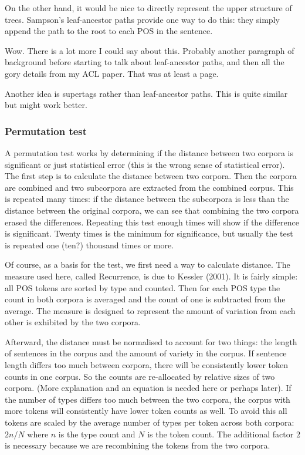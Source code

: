 \documentclass[11pt]{article}
\begin{document}
On the other hand, it would be nice to directly represent the upper
structure of trees. Sampson's leaf-ancestor paths provide one way to
do this: they simply append the path to the root to each POS in the
sentence.

Wow. There is a lot more I could say about this. Probably another
paragraph of background before starting to talk about leaf-ancestor
paths, and then all the gory details from my ACL paper. That was at
least a page.

Another idea is supertags rather than leaf-ancestor paths. This is
quite similar but might work better.

\subsubsection{Permutation test}

A permutation test works by determining if the distance between two
corpora is significant or just statistical error (this is the wrong
sense of statistical error). The first step is to calculate the distance between
two corpora. Then the corpora are combined and two subcorpora are
extracted from the combined corpus. This is repeated many times: if
the distance between the subcorpora is less than the distance between
the original corpora, we can see that combining the two corpora erased
the differences. Repeating this test enough times will show if the
difference is significant. Twenty times is the minimum for
significance, but usually the test is repeated one (ten?) thousand times or more.

Of course, as a basis for the test, we first need a way to calculate
distance. The measure used here, called Recurrence, is due to Kessler
(2001). It is fairly simple: all POS tokens are sorted by type and
counted. Then for each POS type the count in both corpora is averaged
and the count of one is subtracted from the average. The measure is
designed to represent the amount of variation from each other is
exhibited by the two corpora.

Afterward, the distance must be normalised to account for two things:
the length of sentences in the corpus and the amount of variety in the
corpus. If sentence length differs too much between corpora, there
will be consistently lower token counts in one corpus. So the counts
are re-allocated by relative sizes of two corpora. (More explanation
and an equation is needed here or perhaps later). If the number of
types differs too much between the two corpora, the corpus with more
tokens will consistently have lower token counts as well. To avoid
this all tokens are scaled by the average number of types per token
across both corpora: $2n/N$ where $n$ is the type count and $N$ is
the token count. The additional factor $2$ is necessary because we are
recombining the tokens from the two corpora.
\end{document}
